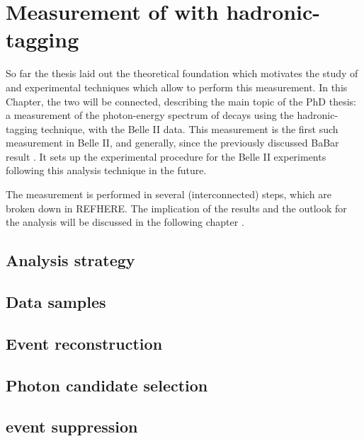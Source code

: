 \chapter{Measurement of \safeBtoXsgamma with hadronic-tagging}

So far the thesis laid out the theoretical foundation which motivates the study of \BtoXsgamma 
and experimental techniques which allow to perform this measurement.
In this Chapter, the two will be connected, describing the main topic of the PhD thesis: 
a measurement of the photon-energy spectrum of \BtoXsgamma decays using the hadronic-tagging technique,
with the Belle II data.
This measurement is the first such measurement in Belle II, and generally, since the previously discussed BaBar result \cite{BaBar:2007yhb}.
It sets up the experimental procedure for the Belle II experiments following this analysis technique in the future.

The measurement is performed in several (interconnected) steps, which are broken down in REFHERE.
The implication of the results and the outlook for the analysis will be discussed in the following chapter .


\section{Analysis strategy}\label{sec:analysis_strategy}


\section{Data samples}\label{sec:data_samples}


\section{Event reconstruction}\label{sec:event_reconstruction}


\section{Photon candidate selection}\label{sec:photon_selection}


\section{\texorpdfstring{\MakeLowercase{\epem\ra\qqbar}}{e+e-->qqbar} event suppression}\label{sec:continuum_suppression}


